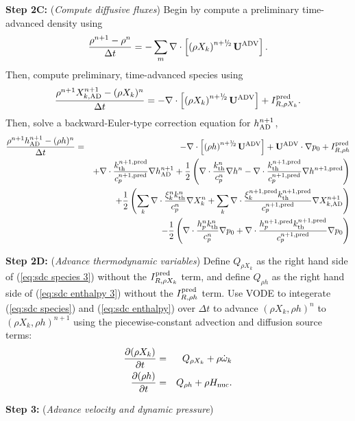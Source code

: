 {\bf Step 2C:} ({\it Compute diffusive fluxes}) Begin by compute a preliminary time-advanced density using
\begin{equation}
\frac{\rho^{n+1} - \rho^n}{\Delta t} = -\sum_m\nabla\cdot\left[\left(\rho X_k\right)^{n+\myhalf}\uadvsdc\right].
\end{equation}
Then, compute preliminary, time-advanced species using
\begin{equation}
\frac{\rho^{n+1}X_{k,{\rm AD}}^{n+1} - (\rho X_k)^n}{\Delta t} = -\nabla\cdot\left[\left(\rho X_k\right)^{n+\myhalf}\uadvsdc\right] + I_{R,\rho X_k}^{\rm pred}.\label{eq:sdc species 3}
\end{equation}
Then, solve a backward-Euler-type correction equation for $h^{n+1}_{\rm AD}$,
\begin{eqnarray}
\frac{\rho^{n+1}h^{n+1}_{\rm AD} - (\rho h)^n}{\Delta t} &=& -\nabla\cdot\left[\left(\rho h\right)^{n+\myhalf}\uadvsdc\right] + \uadvsdc\cdot\nabla p_0 + I_{R,\rho h}^{\rm pred}\nonumber\\
&& + \nabla\cdot\frac{\kth^{n+1,{\rm pred}}}{c_p^{n+1,{\rm pred}}}\nabla h^{n+1}_{\rm AD} + \half\left(\nabla\cdot\frac{\kth^n}{c_p^n}\nabla h^n - \nabla\cdot\frac{\kth^{n+1,{\rm pred}}}{c_p^{n+1,{\rm pred}}}\nabla h^{n+1,{\rm pred}}\right)\nonumber\\
&& + \half\left(\sum_k\nabla\cdot\frac{\xi_k^n k_{\rm th}^n}{c_p^n}\nabla X_k^n + \sum_k\nabla\cdot\frac{\xi_k^{n+1,{\rm pred}} k_{\rm th}^{n+1,{\rm pred}}}{c_p^{n+1,{\rm pred}}}\nabla X_{k,{\rm AD}}^{n+1}\right)\nonumber\\
&& - \half\left(\nabla\cdot\frac{h_p^n k_{\rm th}^n}{c_p^n}\nabla p_0 + \nabla\cdot\frac{h_p^{n+1,{\rm pred}}k_{\rm th}^{n+1,{\rm pred}}}{c_p^{n+1,{\rm pred}}}\nabla p_0\right)\label{eq:sdc enthalpy 3}
\end{eqnarray}

{\bf Step 2D:} ({\it Advance thermodynamic variables}) Define $Q_{\rho X_k}$ as the right hand side of (\ref{eq:sdc species 3}) without the $I_{R,\rho X_k}^{\rm pred}$ term, and define $Q_{\rho h}$ as the right hand side of (\ref{eq:sdc enthalpy 3}) without the $I_{R,\rho h}^{\rm pred}$ term.  Use VODE to integerate (\ref{eq:sdc species}) and (\ref{eq:sdc enthalpy}) over $\Delta t$ to advance $(\rho X_k, \rho h)^n$ to $(\rho X_k, \rho h)^{n+1}$ using the piecewise-constant advection and diffusion source terms:
\begin{eqnarray}
\frac{\partial(\rho X_k)}{\partial t} &=& Q_{\rho X_k} + \rho\dot\omega_k\\
\frac{\partial(\rho h)}{\partial t} &=& Q_{\rho h} + \rho{H_{\rm nuc}}.
\end{eqnarray}

{\bf Step 3:} ({\it Advance velocity and dynamic pressure})\\
